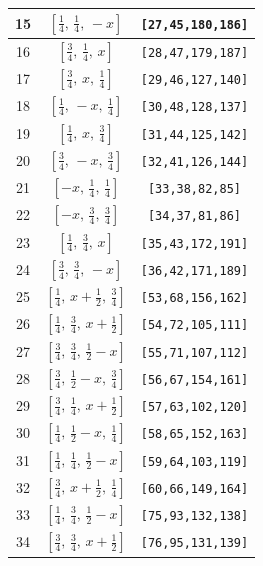 \documentclass[fleqn,8pt]{jsarticle}
\begin{document}
\begin{longtable}{ccc}
15 & $\left[ \frac{1}{4},\, \frac{1}{4},\, - x \right]$ & {\tt [27,45,180,186]} \\ \hline
16 & $\left[ \frac{3}{4},\, \frac{1}{4},\, x \right]$ & {\tt [28,47,179,187]} \\ \hline
17 & $\left[ \frac{3}{4},\, x,\, \frac{1}{4} \right]$ & {\tt [29,46,127,140]} \\ \hline
18 & $\left[ \frac{1}{4},\, - x,\, \frac{1}{4} \right]$ & {\tt [30,48,128,137]} \\ \hline
19 & $\left[ \frac{1}{4},\, x,\, \frac{3}{4} \right]$ & {\tt [31,44,125,142]} \\ \hline
20 & $\left[ \frac{3}{4},\, - x,\, \frac{3}{4} \right]$ & {\tt [32,41,126,144]} \\ \hline
21 & $\left[ - x,\, \frac{1}{4},\, \frac{1}{4} \right]$ & {\tt [33,38,82,85]} \\ \hline
22 & $\left[ - x,\, \frac{3}{4},\, \frac{3}{4} \right]$ & {\tt [34,37,81,86]} \\ \hline
23 & $\left[ \frac{1}{4},\, \frac{3}{4},\, x \right]$ & {\tt [35,43,172,191]} \\ \hline
24 & $\left[ \frac{3}{4},\, \frac{3}{4},\, - x \right]$ & {\tt [36,42,171,189]} \\ \hline
25 & $\left[ \frac{1}{4},\, x + \frac{1}{2},\, \frac{3}{4} \right]$ & {\tt [53,68,156,162]} \\ \hline
26 & $\left[ \frac{1}{4},\, \frac{3}{4},\, x + \frac{1}{2} \right]$ & {\tt [54,72,105,111]} \\ \hline
27 & $\left[ \frac{3}{4},\, \frac{3}{4},\, \frac{1}{2} - x \right]$ & {\tt [55,71,107,112]} \\ \hline
28 & $\left[ \frac{3}{4},\, \frac{1}{2} - x,\, \frac{3}{4} \right]$ & {\tt [56,67,154,161]} \\ \hline
29 & $\left[ \frac{3}{4},\, \frac{1}{4},\, x + \frac{1}{2} \right]$ & {\tt [57,63,102,120]} \\ \hline
30 & $\left[ \frac{1}{4},\, \frac{1}{2} - x,\, \frac{1}{4} \right]$ & {\tt [58,65,152,163]} \\ \hline
31 & $\left[ \frac{1}{4},\, \frac{1}{4},\, \frac{1}{2} - x \right]$ & {\tt [59,64,103,119]} \\ \hline
32 & $\left[ \frac{3}{4},\, x + \frac{1}{2},\, \frac{1}{4} \right]$ & {\tt [60,66,149,164]} \\ \hline
33 & $\left[ \frac{1}{4},\, \frac{3}{4},\, \frac{1}{2} - x \right]$ & {\tt [75,93,132,138]} \\ \hline
34 & $\left[ \frac{3}{4},\, \frac{3}{4},\, x + \frac{1}{2} \right]$ & {\tt [76,95,131,139]} \\ \hline

\end{longtable}
\end{document}
